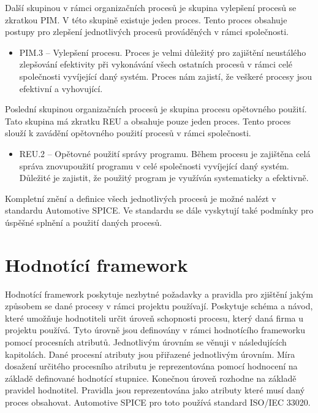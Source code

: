 \documentclass[czech,master]{diploma}
\begin{document}
Další skupinou v rámci organizačních procesů je skupina vylepšení procesů se zkratkou PIM. V této skupině existuje jeden proces. Tento proces obsahuje postupy pro zlepšení jednotlivých procesů prováděných v rámci společnosti.

\begin{itemize}
\item PIM.3 -- Vylepšení procesu. Proces je velmi důležitý pro zajištění neustálého zlepšování efektivity při vykonávání všech ostatních procesů v rámci celé společnosti vyvíjející daný systém. Proces nám zajistí, že veškeré procesy jsou efektivní a vyhovující.
\end{itemize}

Poslední skupinou organizačních procesů je skupina procesu opětovného použití. Tato skupina má zkratku REU a obsahuje pouze jeden proces. Tento proces slouží k zavádění opětovného použití procesů v rámci společnosti.

\begin{itemize}
\item REU.2 -- Opětovné použití správy programu. Během procesu je zajištěna celá správa znovupoužití programu v celé společnosti vyvíjející daný systém. Důležité je zajistit, že použitý program je využíván systematicky a efektivně.
\end{itemize}


Kompletní znění a definice všech jednotlivých procesů je možné nalézt v standardu Automotive SPICE. \cite{ref:aspice_procesy} Ve standardu se dále vyskytují také podmínky pro úspěšné splnění a použití daných procesů.


\section{Hodnotící framework}
Hodnotící framework poskytuje nezbytné požadavky a pravidla pro zjištění jakým způsobem se dané procesy v rámci projektu používají. Poskytuje schéma a návod, které umožňuje hodnotiteli určit úroveň schopnosti procesu, který daná firma u projektu používá. Tyto úrovně jsou definovány v rámci hodnotícího frameworku pomocí procesních atributů. Jednotlivým úrovním se věnuji v následujících kapitolách. Dané procesní atributy jsou přiřazené jednotlivým úrovním. Míra dosažení určitého procesního atributu je reprezentována pomocí hodnocení na základě definované hodnotící stupnice. Konečnou úroveň rozhodne na základě pravidel hodnotitel. Pravidla jsou reprezentována jako atributy které musí daný proces obsahovat. Automotive SPICE pro toto používá standard ISO/IEC 33020. \cite{ref:aspice_download_1523}
\end{document}
